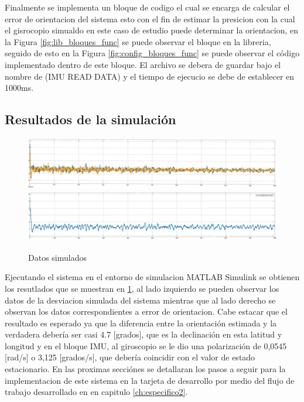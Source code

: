 Finalmente se implementa un bloque de codigo el cual se encarga de calcular el error de orientacion del sistema esto con el fin de estimar la presicion con la cual el gisrocopio simualdo en este caso de estudio puede determinar la orientacion, en la Figura \ref{fig:lib_bloques_func} se puede observar el bloque en la libreria, seguido de esto en la Figura \ref{fig:config_bloques_func} se puede observar el código implementado dentro de este bloque. El archivo se debera de guardar bajo el nombre de (IMU READ DATA) y el tiempo de ejecucio se debe de establecer en 1000ms. 

\subsection{Resultados de la simulación}\label{subsub:resultados_simulados_IMU}

\begin{figure}[htbp]
    \centering
    \includegraphics[scale=0.3]{fig/Capitulo5/Caso_de_estudio_IMU/data/simulated/bias.pdf}
    \vspace{1cm}
    \includegraphics[scale=0.3]{fig/Capitulo5/Caso_de_estudio_IMU/data/simulated/error.pdf}
    \caption{Datos simulados}
    \label{fig:data_simulated}
\end{figure}

Ejecutando el sistema en el entorno de simulacion MATLAB Simulink se obtienen los resutlados que se muestran en \ref{fig:data_simulated}, al lado izquierdo se pueden observar los datos de la desviacion simulada del sistema mientras que al lado derecho se observan los datos correspondientes a error de orientacion. Cabe estacar que el resultado es esperado ya que la diferencia entre la orientación estimada y la verdadera debería ser casi 4.7 [grados], que es la declinación en esta latitud y longitud y en el bloque IMU, al giroscopio se le dio una polarización de 0,0545 [rad/s] o 3,125 [grados/s], que debería coincidir con el valor de estado estacionario. En las proximas secciónes se detallaran los pasos a seguir para la implementacion de este sistema en la tarjeta de desarrollo por medio del flujo de trabajo desarrollado en en capitulo \ref{ch:especifico2}. 


